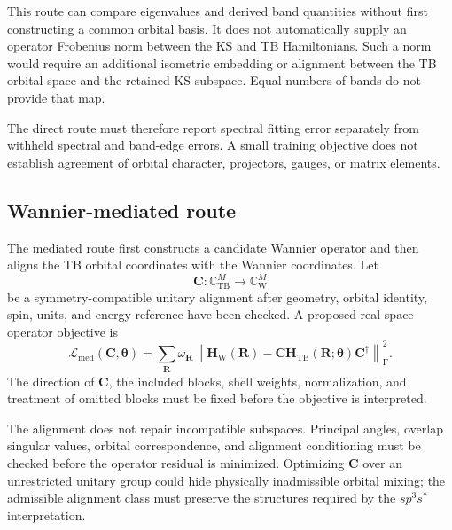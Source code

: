 This route can compare eigenvalues and derived band quantities without first
constructing a common orbital basis. It does not automatically supply an
operator Frobenius norm between the KS and TB Hamiltonians. Such a norm would
require an additional isometric embedding or alignment between the TB orbital
space and the retained KS subspace. Equal numbers of bands do not provide that
map.

The direct route must therefore report spectral fitting error separately from
withheld spectral and band-edge errors. A small training objective does not
establish agreement of orbital character, projectors, gauges, or matrix
elements.

\subsection{Wannier-mediated route}


The mediated route first constructs a candidate Wannier operator and then
aligns the TB orbital coordinates with the Wannier coordinates. Let
\begin{equation}
    \mathbf C:
    \mathbb C^M_{\mathrm{TB}}
    \longrightarrow
    \mathbb C^M_{\mathrm W}
\end{equation}
be a symmetry-compatible unitary alignment after geometry, orbital identity,
spin, units, and energy reference have been checked. A proposed real-space
operator objective is
\begin{equation}
    \mathcal L_{\mathrm{med}}
    (\mathbf C,\boldsymbol\theta)
    =
    \sum_{\mathbf R}
    \omega_{\mathbf R}
    \left\lVert
        \mathbf H_{\mathrm W}(\mathbf R)
        -
        \mathbf C
        \mathbf H_{\mathrm{TB}}(\mathbf R;\boldsymbol\theta)
        \mathbf C^\dagger
    \right\rVert_{\mathrm F}^2.
\end{equation}
The direction of $\mathbf C$, the included blocks, shell weights,
normalization, and treatment of omitted blocks must be fixed before the
objective is interpreted.

The alignment does not repair incompatible subspaces. Principal angles,
overlap singular values, orbital correspondence, and alignment conditioning
must be checked before the operator residual is minimized. Optimizing
$\mathbf C$ over an unrestricted unitary group could hide physically
inadmissible orbital mixing; the admissible alignment class must preserve the
structures required by the $sp^3s^{\ast}$ interpretation.


